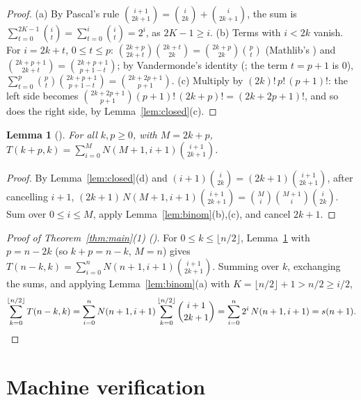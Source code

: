 \documentclass[11pt]{amsart}
\theoremstyle{plain}
\newtheorem{lemma}[theorem]{Lemma}
\theoremstyle{definition}
\begin{document}
\begin{proof}
(a) By Pascal's rule $\binom{i+1}{2k+1}=\binom i{2k}+\binom i{2k+1}$, the sum is $\sum_{t=0}^{2K-1}\binom it=\sum_{t=0}^{i}\binom it=2^i$, as $2K-1\ge i$. (b) Terms with $i<2k$ vanish. For $i=2k+t$, $0\le t\le p$: $\binom{2k+p}{2k+t}\binom{2k+t}{2k}=\binom{2k+p}{2k}\binom pt$ (Mathlib's ) and $\binom{2k+p+1}{2k+t}=\binom{2k+p+1}{p+1-t}$; by Vandermonde's identity (; the term $t=p+1$ is $0$), $\sum_{t=0}^{p}\binom pt\binom{2k+p+1}{p+1-t}=\binom{2k+2p+1}{p+1}$. (c) Multiply by $(2k)!\,p!\,(p+1)!$: the left side becomes $\binom{2k+2p+1}{p+1}(p+1)!\,(2k+p)!=(2k+2p+1)!$, and so does the right side, by Lemma~\ref{lem:closed}(c).
\end{proof}

\begin{lemma}[]\label{lem:A}
For all $k,p\ge0$, with $M=2k+p$, $T(k+p,k)=\sum_{i=0}^{M}N(M+1,i+1)\binom{i+1}{2k+1}$.
\end{lemma}

\begin{proof}
By Lemma~\ref{lem:closed}(d) and $(i+1)\binom i{2k}=(2k+1)\binom{i+1}{2k+1}$, after cancelling $i+1$,
$(2k+1)\,N(M+1,i+1)\binom{i+1}{2k+1}=\binom Mi\binom{M+1}i\binom i{2k}$. Sum over $0\le i\le M$, apply Lemma~\ref{lem:binom}(b),(c), and cancel $2k+1$.
\end{proof}

\begin{proof}[Proof of Theorem~\ref{thm:main}(1) \textup{()}]
For $0\le k\le\lfloor n/2\rfloor$, Lemma~\ref{lem:A} with $p=n-2k$ (so $k+p=n-k$, $M=n$) gives $T(n-k,k)=\sum_{i=0}^{n}N(n+1,i+1)\binom{i+1}{2k+1}$. Summing over $k$, exchanging the sums, and applying Lemma~\ref{lem:binom}(a) with $K=\lfloor n/2\rfloor+1>n/2\ge i/2$,
\[
  \sum_{k=0}^{\lfloor n/2\rfloor}T(n-k,k)=\sum_{i=0}^{n}N(n+1,i+1)\sum_{k=0}^{\lfloor n/2\rfloor}\binom{i+1}{2k+1}=\sum_{i=0}^{n}2^i\,N(n+1,i+1)=s(n+1).\qedhere
\]
\end{proof}

\section{Machine verification}\label{sec:lean}
\end{document}
